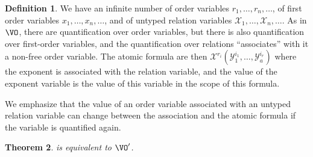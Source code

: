 \documentclass[a4paper,12pt]{article}
\newtheorem{theorem}{Theorem}[section]
\theoremstyle{definition}
\newtheorem{definition}[theorem]{Definition}
\newcommand{\mc}{\mathcal}
\begin{document}
\begin{definition}
  We have an infinite number of order variables
  $r_{1},\dots,r_{n},\dots$, of first order variables
  $x_{1},\dots,x_{n},\dots$, and of untyped relation variables $\mc
  X_{1},\dots,\mc X_{n},\dots$. As in $\VO$, there are quantification
  over order variables, but there is also quantification over
  first-order variables, and the quantification over relations
  ``associates'' with it a non-free order variable. The atomic formula
  are then $\mc X^{r_{i}}(\mc Y_{1}^{i_{1}},\dots,\mc Y_{a}^{i_{r}})$
  where the exponent is associated with the relation variable, and the
  value of the exponent variable is the value of this variable in the
  scope of this formula.

  We emphasize that the value of an order variable associated
  with an untyped relation variable can change between the association
  and the atomic formula if the variable is quantified again.
\end{definition}
\begin{theorem}\label{vovo}
  \VO{} is equivalent to $\VO'$.
\end{theorem}
\end{document}

